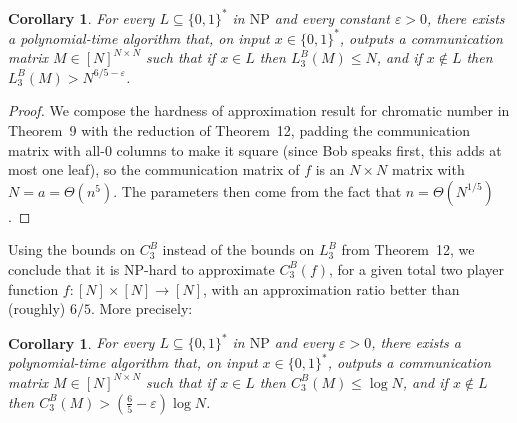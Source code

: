 \documentclass[10pt,a4paper]{article}
\newtheorem{corollary}[theorem]{Corollary}
\begin{document}
\begin{corollary}
For every $L\subseteq\{0,1\}^*$ in $\mathrm{NP}$ and every constant $\varepsilon>0$, there exists a polynomial-time algorithm that, on input $x\in\{0,1\}^*$, outputs a communication matrix $M\in[N]^{N\times N}$ such that if $x\in L$ then $L_3^B(M)\le N$, and if $x\notin L$ then $L_3^B(M)>N^{6/5-\varepsilon}$.
\end{corollary}
\begin{proof}
We compose the hardness of approximation result for chromatic number in Theorem~9 with the reduction of Theorem~12, padding the communication matrix with all-0 columns to make it square (since Bob speaks first, this adds at most one leaf), so the communication matrix of $f$ is an $N\times N$ matrix with $N=a=\Theta(n^5)$. The parameters then come from the fact that $n=\Theta(N^{1/5})$.
\end{proof}
Using the bounds on $C_3^B$ instead of the bounds on $L_3^B$ from Theorem~12, we conclude that it is NP-hard to approximate $C_3^B(f)$, for a given total two player function $f:[N]\times[N]\to[N]$, with an approximation ratio better than (roughly) $6/5$. More precisely:
\begin{corollary}
For every $L\subseteq\{0,1\}^*$ in $\mathrm{NP}$ and every $\varepsilon>0$, there exists a polynomial-time algorithm that, on input $x\in\{0,1\}^*$, outputs a communication matrix $M\in[N]^{N\times N}$ such that if $x\in L$ then $C_3^B(M)\le\log N$, and if $x\notin L$ then $C_3^B(M)>(\frac65-\varepsilon)\log N$.
\end{corollary}
\end{document}
